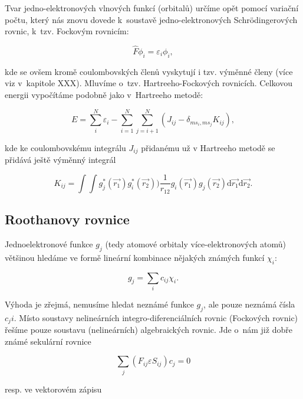 Tvar jedno-elektronových vlnových funkcí (orbitalů) určíme opět pomocí variační počtu, který nás znovu dovede k~soustavě jedno-elektronových  Schr\"odingerových rovnic, k~tzv. Fockovým rovnicím:

\begin{equation}
\hat{F}\phi_i = \varepsilon_i \phi_i,
\label{rov:VE-49}
\end{equation}

\noindent kde se ovšem kromě coulombovských členů vyskytují i tzv. výměnné členy (více viz v~kapitole XXX). Mluvíme o~tzv. Hartreeho-Fockových rovnicích. Celkovou energii vypočítáme podobně jako v~Hartreeho metodě:

\begin{equation}
E = \sum_{i}^N \varepsilon_i - \sum_{i=1}^N \sum_{j=i+1}^N (J_{ij} - \delta_{ms_i,ms_j} K_{ij}),
\label{rov:VE-50}
\end{equation}

\noindent kde ke coulombovskému integrálu $J_{ij}$ přidanému už v Hartreeho metodě se přidává ještě výměnný integrál


\begin{equation}
K_{ij} = \int \int g_j^{\ast} (\vec{r_1}) g_i^{\ast}(\vec{r_2})) \frac{1}{r_{12}} g_i(\vec{r_1}) g_j(\vec{r_2}) \mathrm{d}\vec{r_1} \mathrm{d}\vec{r_2}.
\label{rov:VE-51}
\end{equation}


\subsection{Roothanovy rovnice}
Jednoelektronové funkce $g_j$ (tedy atomové orbitaly více-elektronových atomů) většinou hledáme ve formě lineární kombinace nějakých známých funkcí $\chi_i$:

\begin{equation}
g_j = \sum_i c_{ij} \chi_i.
\label{rov:VE-52}
\end{equation}

\noindent Výhoda je zřejmá, nemusíme hledat neznámé funkce $g_j$, ale pouze neznámá čísla $c_ji$. Místo soustavy nelineárních integro-diferenciálních rovnic (Fockových rovnic) řešíme pouze soustavu (nelineárních) algebraických rovnic. Jde o~nám již dobře známé sekulární rovnice

\begin{equation}
\sum_j (F_{ij} \varepsilon S_{ij}) c_j = 0
\label{rov:VE-53}
\end{equation}

\noindent resp. ve vektorovém zápisu

